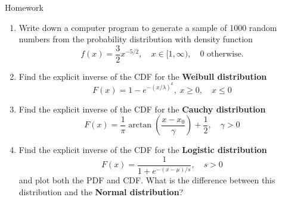 \documentclass[8pt]{beamer}
\begin{document}
\begin{frame}{Homework}
\begin{enumerate}
	\item Write down a computer program to generate a sample of 1000 random numbers from the probability distribution with density function 
\begin{equation*}
f(x) = \frac{3}{2} x^{-5/2}, \quad x \in [1, \infty), \quad 0 \text{ otherwise.}
\end{equation*}
	\item Find the explicit inverse of the CDF for the \textbf{Weibull distribution} $$F(x) = 1 - e^{-(x/\lambda)^k}, \ x \ge 0, \quad x \leq 0$$
	\item Find the explicit inverse of the CDF for the \textbf{Cauchy distribution} $$F(x) = \frac{1}{\pi} \arctan\left(\frac{x-x_0}{\gamma}\right) + \frac{1}{2}, \quad \gamma>0$$ 
	\item Find the explicit inverse of the CDF for the \textbf{Logistic distribution} $$F(x) = \frac{1}{1 + e^{-(x-\mu)/s}}, \quad s > 0$$ and plot both the PDF and CDF. What is the difference between this distribution and the \textbf{Normal distribution}?
\end{enumerate}
\end{frame}
\end{document}
